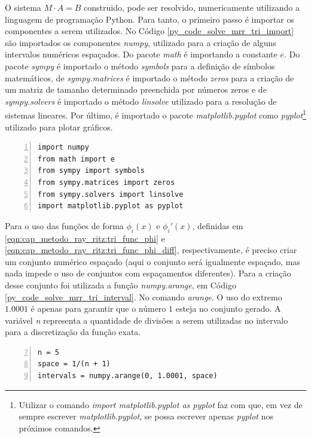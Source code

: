 \documentclass[
	12pt,				%
	openright,			%
    twoside,			%
	a4paper,			%
	english,			%
	french,				%
	spanish,			%
	brazil				%
	]{abntex2}
\numberwithin{lema}{chapter}
\numberwithin{teorema}{chapter}
\numberwithin{definicao}{chapter}
\numberwithin{exemplo}{chapter}
\numberwithin{figure}{chapter}
\begin{document}
O sistema $M\cdot A=B$ construido, pode ser resolvido, numericamente utilizando a linguagem de programação Python. Para tanto, o primeiro passo é importar os componentes a serem utilizados. No Código \ref{py_code_solve_mrr_tri_import} são importados os componentes \textit{numpy}, utilizado para a criação de alguns intervalos numéricos espaçados. Do pacote \textit{math} é importando a constante $e$. Do pacote \textit{sympy} é importado o método \textit{symbols} para a definição de símbolos matemáticos, de \textit{sympy.matrices} é importado o método \textit{zeros} para a criação de um matriz de tamanho determinado preenchida por números zeros e de \textit{sympy.solvers} é importado o método \textit{linsolve} utilizado para a resolução de sistemas lineares. Por último, é importado o pacote \textit{matplotlib.pyplot} como \textit{pyplot}\footnote{Utilizar o comando \textit{import matplotlib.pyplot as pyplot} faz com que, em vez de sempre escrever \textit{matplotlib.pyplot}, se possa escrever apenas \textit{pyplot} nos próximos comandos.} utilizado para plotar gráficos.

\begin{lstlisting}[style=Python, xleftmargin=2em, numbers=left, firstnumber=1, caption={Importação dos Pacotes Utilizados para a Resolução}, captionpos=t, label=py_code_solve_mrr_tri_import]
import numpy
from math import e
from sympy import symbols
from sympy.matrices import zeros
from sympy.solvers import linsolve
import matplotlib.pyplot as pyplot
\end{lstlisting}

Para o uso das funções de forma $\phi_i(x)$ e $\phi_i'(x)$, definidas em \eqref{eqn:cap_metodo_ray_ritz:tri_func_phi} e \eqref{eqn:cap_metodo_ray_ritz:tri_func_phi_diff}, respectivamente, é preciso criar um conjunto numérico espaçado (aqui o conjunto será igualmente espaçado, mas nada impede o uso de conjuntos com espaçamentos diferentes). Para a criação desse conjunto foi utilizada a função \textit{numpy.arange}, em Código \ref{py_code_solve_mrr_tri_interval}. No comando \textit{arange}. O uso do extremo $1.0001$ é apenas para garantir que o número $1$ esteja no conjunto gerado. A variável \textit{n} representa a quantidade de divisões a serem utilizadas no intervalo para a discretização da função exata.

\begin{lstlisting}[style=Python, xleftmargin=2em, numbers=left, firstnumber=7, caption={Criação dos intervalos numéricos}, captionpos=t, label=py_code_solve_mrr_tri_interval]
n = 5
space = 1/(n + 1)
intervals = numpy.arange(0, 1.0001, space)
\end{lstlisting}
\end{document}
